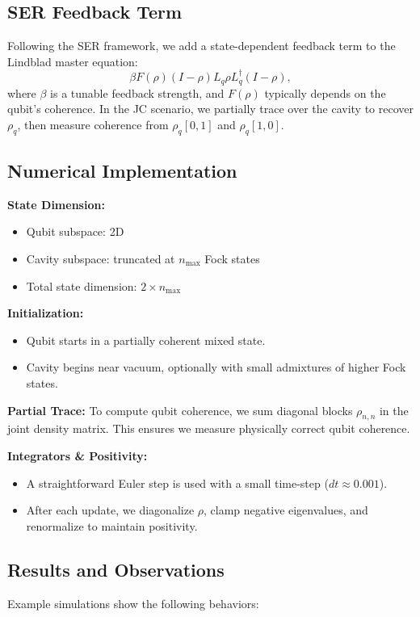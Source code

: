 \documentclass{article}
\begin{document}
\subsection{SER Feedback Term}
Following the SER framework, we add a state-dependent feedback term to the Lindblad master equation:
\[
\beta F(\rho) (I - \rho) L_q \rho L_q^\dagger (I - \rho),
\]
where $\beta$ is a tunable feedback strength, and $F(\rho)$ typically depends on the qubit’s coherence. In the JC scenario, we partially trace over the cavity to recover $\rho_q$, then measure coherence from $\rho_q[0,1]$ and $\rho_q[1,0]$.

\subsection{Numerical Implementation}
\textbf{State Dimension:}
\begin{itemize}
    \item Qubit subspace: 2D
    \item Cavity subspace: truncated at $n_{\text{max}}$ Fock states
    \item Total state dimension: $2 \times n_{\text{max}}$
\end{itemize}

\textbf{Initialization:}
\begin{itemize}
    \item Qubit starts in a partially coherent mixed state.
    \item Cavity begins near vacuum, optionally with small admixtures of higher Fock states.
\end{itemize}

\textbf{Partial Trace:}
To compute qubit coherence, we sum diagonal blocks $\rho_{n,n}$ in the joint density matrix. This ensures we measure physically correct qubit coherence.

\textbf{Integrators \& Positivity:}
\begin{itemize}
    \item A straightforward Euler step is used with a small time-step ($dt \approx 0.001$).
    \item After each update, we diagonalize $\rho$, clamp negative eigenvalues, and renormalize to maintain positivity.
\end{itemize}

\subsection{Results and Observations}
Example simulations show the following behaviors:
\end{document}
